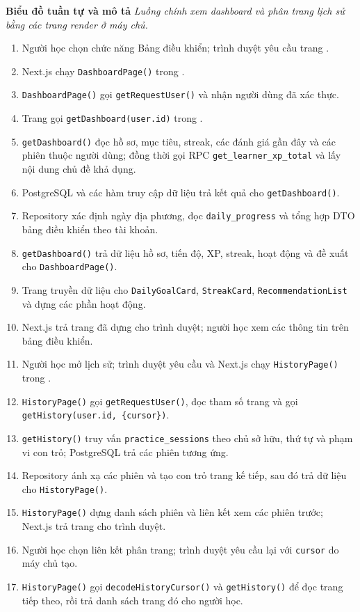 \documentclass[12pt,a4paper,oneside]{report}
\begin{document}
\noindent\textbf{Biểu đồ tuần tự và mô tả}
\noindent\textit{Luồng chính xem dashboard và phân trang lịch sử bằng các trang render ở máy chủ.}
\begin{enumerate}
    \item Người học chọn chức năng Bảng điều khiển; trình duyệt yêu cầu trang .
    \item Next.js chạy \texttt{DashboardPage()} trong .
    \item \texttt{DashboardPage()} gọi \texttt{getRequestUser()} và nhận người dùng đã xác thực.
    \item Trang gọi \texttt{getDashboard(user.id)} trong .
    \item \texttt{getDashboard()} đọc hồ sơ, mục tiêu, streak, các đánh giá gần đây và các phiên thuộc người dùng; đồng thời gọi RPC \texttt{get\_learner\_xp\_total} và lấy nội dung chủ đề khả dụng.
    \item PostgreSQL và các hàm truy cập dữ liệu trả kết quả cho \texttt{getDashboard()}.
    \item Repository xác định ngày địa phương, đọc \texttt{daily\_progress} và tổng hợp DTO bảng điều khiển theo tài khoản.
    \item \texttt{getDashboard()} trả dữ liệu hồ sơ, tiến độ, XP, streak, hoạt động và đề xuất cho \texttt{DashboardPage()}.
    \item Trang truyền dữ liệu cho \texttt{DailyGoalCard}, \texttt{StreakCard}, \texttt{RecommendationList} và dựng các phần hoạt động.
    \item Next.js trả trang đã dựng cho trình duyệt; người học xem các thông tin trên bảng điều khiển.
    \item Người học mở lịch sử; trình duyệt yêu cầu  và Next.js chạy \texttt{HistoryPage()} trong .
    \item \texttt{HistoryPage()} gọi \texttt{getRequestUser()}, đọc tham số trang và gọi \texttt{getHistory(user.id, \{cursor\})}.
    \item \texttt{getHistory()} truy vấn \texttt{practice\_sessions} theo chủ sở hữu, thứ tự và phạm vi con trỏ; PostgreSQL trả các phiên tương ứng.
    \item Repository ánh xạ các phiên và tạo con trỏ trang kế tiếp, sau đó trả dữ liệu cho \texttt{HistoryPage()}.
    \item \texttt{HistoryPage()} dựng danh sách phiên và liên kết xem các phiên trước; Next.js trả trang cho trình duyệt.
    \item Người học chọn liên kết phân trang; trình duyệt yêu cầu lại  với \texttt{cursor} do máy chủ tạo.
    \item \texttt{HistoryPage()} gọi \texttt{decodeHistoryCursor()} và \texttt{getHistory()} để đọc trang tiếp theo, rồi trả danh sách trang đó cho người học.
\end{enumerate}
\end{document}
